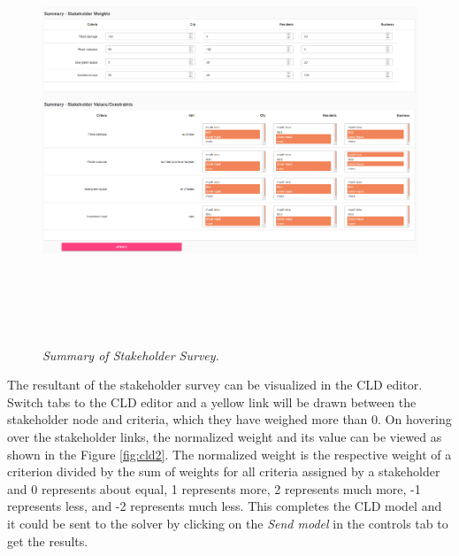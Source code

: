 \documentclass[a4paper]{article}
\begin{document}
\begin{figure}[p]
\begin{center}
\includegraphics[width=6in, height=5in]{img/sSummary.png}
\caption{\small \sl Summary of Stakeholder Survey.\label{fig:sSummary}}
\end{center}
\end{figure}

The resultant of the stakeholder survey can be visualized in the CLD editor. Switch tabs to the CLD editor and a yellow link will be drawn between the stakeholder node and criteria, which they have weighed more than 0. On hovering over the stakeholder links, the normalized weight and its value can be viewed as shown in the Figure \ref{fig:cld2}. The normalized weight is the respective weight of a criterion divided by the sum of weights for all criteria assigned by a stakeholder and 0 represents about equal, 1 represents more, 2 represents much more, -1 represents less, and -2 represents much less. This completes the CLD model and it could be sent to the solver by clicking on the \textit{Send model} in the controls tab to get the results.
\end{document}
